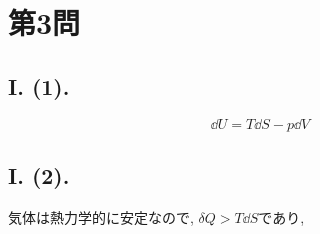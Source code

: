 

\section*{第3問}

\subsection*{I. (1). }
\begin{equation}
  \dd{U}=T\dd{S}-p\dd{V}
\end{equation}

\subsection*{I. (2). }
気体は熱力学的に安定なので, $\delta Q>T\dd{S}$であり, 





